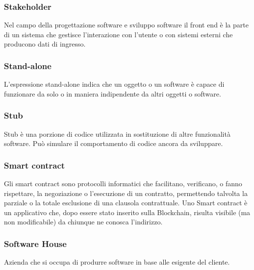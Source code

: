 \subsubsection*{Stakeholder}
Nel campo della progettazione software e sviluppo software il front end è la parte di un sistema che gestisce l’interazione con l’utente o con sistemi esterni che producono dati di ingresso.
\subsubsection*{Stand-alone}
L'espressione stand-alone indica che un oggetto o un software è capace di funzionare da solo o in maniera indipendente da altri oggetti o software.
\subsubsection*{Stub}
Stub è una porzione di codice utilizzata in sostituzione di altre funzionalità software. Può simulare il comportamento di codice ancora da sviluppare.

\subsubsection*{Smart contract}
Gli smart contract sono protocolli informatici che facilitano, verificano, o fanno rispettare, la negoziazione o l'esecuzione di un contratto, permettendo talvolta la parziale o la totale esclusione di una clausola contrattuale. Uno Smart contract è un applicativo che, dopo essere stato inserito sulla Blockchain\glos, risulta visibile (ma non modificabile) da chiunque ne conosca l'indirizzo.


\subsubsection*{Software House}
Azienda che si occupa di produrre software in base alle esigente del cliente.